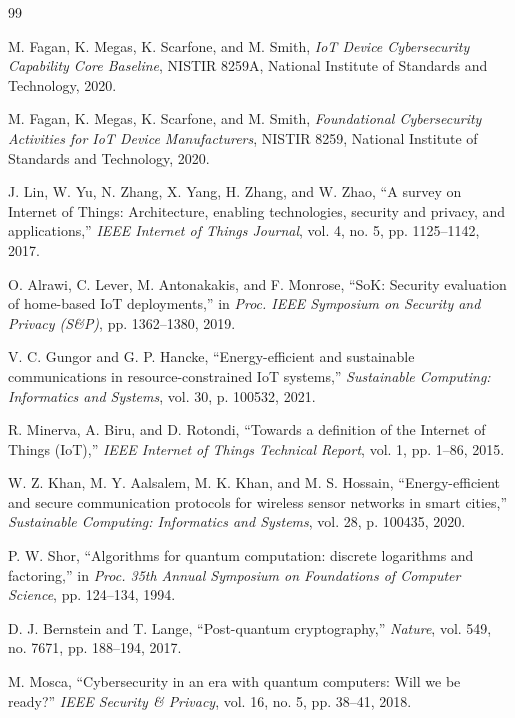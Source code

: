 \documentclass[journal]{IEEEtran}
\begin{document}

\begin{thebibliography}{99}

M. Fagan, K. Megas, K. Scarfone, and M. Smith,
\emph{IoT Device Cybersecurity Capability Core Baseline},
NISTIR 8259A,
National Institute of Standards and Technology, 2020.

M. Fagan, K. Megas, K. Scarfone, and M. Smith,
\emph{Foundational Cybersecurity Activities for IoT Device Manufacturers},
NISTIR 8259,
National Institute of Standards and Technology, 2020.

J. Lin, W. Yu, N. Zhang, X. Yang, H. Zhang, and W. Zhao,
``A survey on Internet of Things: Architecture, enabling technologies, security and privacy, and applications,''
\emph{IEEE Internet of Things Journal}, vol. 4, no. 5, pp. 1125--1142, 2017.

O. Alrawi, C. Lever, M. Antonakakis, and F. Monrose,
``SoK: Security evaluation of home-based IoT deployments,''
in \emph{Proc. IEEE Symposium on Security and Privacy (S\&P)}, pp. 1362--1380, 2019.

V. C. Gungor and G. P. Hancke,
``Energy-efficient and sustainable communications in resource-constrained IoT systems,''
\emph{Sustainable Computing: Informatics and Systems}, vol. 30, p. 100532, 2021.

R. Minerva, A. Biru, and D. Rotondi,
``Towards a definition of the Internet of Things (IoT),''
\emph{IEEE Internet of Things Technical Report}, vol. 1, pp. 1--86, 2015.

W. Z. Khan, M. Y. Aalsalem, M. K. Khan, and M. S. Hossain,
``Energy-efficient and secure communication protocols for wireless sensor networks in smart cities,''
\emph{Sustainable Computing: Informatics and Systems}, vol. 28, p. 100435, 2020.

P. W. Shor,
``Algorithms for quantum computation: discrete logarithms and factoring,''
in \emph{Proc. 35th Annual Symposium on Foundations of Computer Science}, pp. 124--134, 1994.

D. J. Bernstein and T. Lange,
``Post-quantum cryptography,''
\emph{Nature}, vol. 549, no. 7671, pp. 188--194, 2017.

M. Mosca,
``Cybersecurity in an era with quantum computers: Will we be ready?''
\emph{IEEE Security \& Privacy}, vol. 16, no. 5, pp. 38--41, 2018.


\end{thebibliography}
\end{document}
